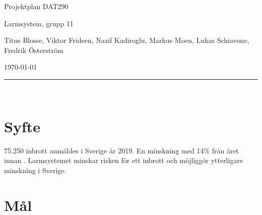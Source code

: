 \documentclass[a4paper]{article}
\newcommand\namn{Larmsystem}
\begin{document}
%
%

\thispagestyle{empty}

\begin{center}
    \parskip=14pt%
    \vspace*{3\parskip}%

    {\LARGE Projektplan DAT290}

    {\large \namn, grupp 11

    Titus Blosse, Viktor Frideen, Nazif Kadiroglu, Markus Moen, Lukas Schiavone, Fredrik Österström

    \today}

    \rule{7cm}{0.4pt}\\
\end{center}
\newpage

%
%

\thispagestyle{empty}

\tableofcontents
\newpage

%
%


\section{Syfte}

75.250 inbrott anmäldes i Sverige år 2019. En minskning med 14\% från året innan \cite{brastold}. Larmsystemet minskar risken för ett inbrott och möjliggör ytterligare minskning i Sverige. %



\section{Mål}
\end{document}

